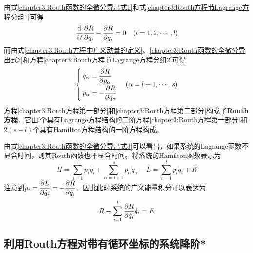 由式\eqref{chapter3:Routh函数的全微分导出式1}和式\eqref{chapter3:Routh方程节Lagrange方程分组1}可得
\begin{equation}
	\dfrac{\mathrm{d}}{\mathrm{d} t} \frac{\partial R}{\partial q_i} - \frac{\partial R}{\partial q_i} = 0\quad (i=1,2,\cdots,l) 
	\label{chapter3:Routh方程第一部分}
\end{equation}
而由式\eqref{chapter3:Routh方程中广义动量的定义}、\eqref{chapter3:Routh函数的全微分导出式2}和方程\eqref{chapter3:Routh方程节Lagrange方程分组2}可得
\begin{equation}
\begin{cases}
	\dot{q}_\alpha = \dfrac{\partial R}{\partial p_\alpha} \\[1.5ex]
	\dot{p}_\alpha = -\dfrac{\partial R}{\partial q_\alpha}
\end{cases}
(\alpha=l+1,\cdots,s)
\label{chapter3:Routh方程第二部分}
\end{equation}
方程\eqref{chapter3:Routh方程第一部分}和\eqref{chapter3:Routh方程第二部分}构成了{\bf Routh方程}，它由$l$个具有Lagrange方程结构的二阶方程\eqref{chapter3:Routh方程第一部分}和$2(s-l)$个具有Hamilton方程结构的一阶方程构成。

由式\eqref{chapter3:Routh函数的全微分导出式3}可以看出，如果系统的Lagrange函数不显含时间，则其Routh函数也不显含时间。将系统的Hamilton函数表示为
\begin{equation}
	H = \sum_{i=1}^l p_i\dot{q}_i + \sum_{\alpha=l+1}^s p_\alpha\dot{q}_\alpha-L = \sum_{i=1}^l p_i\dot{q}_i + R
\end{equation}
注意到$p_i = \dfrac{\partial L}{\partial \dot{q}_i} = -\dfrac{\partial R}{\partial \dot{q}_i}$，因此此时系统的广义能量积分可以表达为
\begin{equation}
	R - \sum_{i=1}^l \frac{\partial R}{\partial \dot{q}_i}\dot{q}_i = E
	\label{chapter3:用Routh函数表示的广义能量积分}
\end{equation}

\subsection{利用Routh方程对带有循环坐标的系统降阶*}

